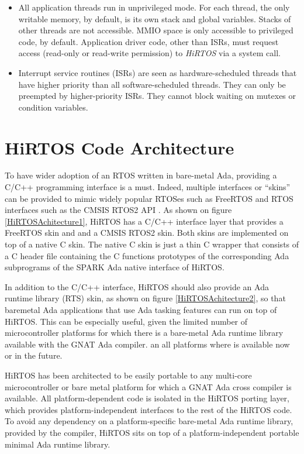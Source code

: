 \documentclass[11pt,letterpaper,twoside,openany]{book}
\begin{document}
\begin{itemize}
\item
All application threads run in unprivileged mode. For each thread, the only writable memory,
by default, is its own stack and global variables. Stacks of other threads are not accessible.
MMIO space is only accessible to privileged code, by default. Application driver code, other
than ISRs, must request access (read-only or read-write permission) to \emph{HiRTOS} via a
system call.

\item Interrupt service routines (ISRs) are seen as hardware-scheduled threads that have higher priority than all
software-scheduled threads. They can only be preempted by higher-priority ISRs.
They cannot block waiting on mutexes or condition variables.
\end{itemize}

\section{HiRTOS Code Architecture}

To have wider adoption of an RTOS written in bare-metal Ada, providing a C/C++ programming interface
is a must. Indeed, multiple interfaces or ``skins'' can be provided to mimic widely popular
RTOSes such as FreeRTOS \cite{freeRTOS} and RTOS interfaces such as the CMSIS RTOS2 API \cite{cmsisRTOS}.
As shown on figure \ref{HiRTOSAchitecture1}, HiRTOS has a C/C++ interface layer that provides
a FreeRTOS skin and and a CMSIS RTOS2 skin. Both skins are implemented on top of a native C skin.
The native C skin is just a thin C wrapper that consists of a C header file containing the C
functions prototypes of the corresponding Ada subprograms of the SPARK Ada native interface of HiRTOS.

In addition to the C/C++ interface, HiRTOS should also provide an Ada runtime library (RTS) skin,
as shown on figure \ref{HiRTOSAchitecture2}, so that baremetal Ada applications that use Ada tasking
features can run on top of HiRTOS. This can be especially useful, given the limited number of
microcontroller platforms for which there is a bare-metal Ada runtime library available with the
GNAT Ada compiler. an all platforms where is available now or in the future.

HiRTOS has been architected to be easily portable to any multi-core microcontroller or bare metal
platform for which a GNAT Ada cross compiler is available. All platform-dependent code is isolated in the
HiRTOS porting layer, which provides platform-independent interfaces to the rest of the HiRTOS code.
To avoid any dependency on a platform-specific bare-metal Ada runtime library, provided by the
compiler, HiRTOS sits on top of a platform-independent portable minimal Ada runtime library.
\end{document}
